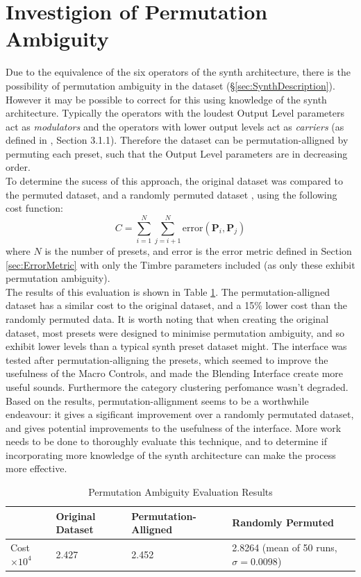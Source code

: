 \documentclass[11pt, oneside]{report}   	%
\renewcommand{\vec}[1]{\mathbf{#1}}
\begin{document}
\section{Investigion of Permutation Ambiguity}\label{sec:PermutationAmbiguity}
\vspace{-5pt}
Due to the equivalence of the six operators of the synth architecture, there is the possibility of permutation ambiguity in the dataset (\S \ref{sec:SynthDescription}). However it may be possible to correct for this using knowledge of the synth architecture. Typically the operators with the loudest Output Level parameters act as \emph{modulators} and the operators with lower output levels act as \emph{carriers} (as defined in \cite{YeeKing}, Section 3.1.1). Therefore the dataset can be permutation-alligned by permuting each preset, such that the Output Level parameters are in decreasing order.\\
To determine the sucess of this approach, the original dataset was compared to the permuted dataset, and a randomly permuted dataset , using the following cost function:
\begin{equation}
	C = \sum_{i = 1}^{N}\sum_{j = i+1}^{N}\mathrm{error}(\vec{P}_i, \vec{P}_j)
\end{equation}
where $N$ is the number of presets, and $\mathrm{error}$ is the error metric defined in Section \ref{sec:ErrorMetric} with only the Timbre parameters included (as only these exhibit permutation ambiguity).\\
The results of this evaluation is shown in Table \ref{tab:PermutationAmbiguity}. The permutation-alligned dataset has a similar cost to the original dataset, and a 15\% lower cost than the randomly permuted data. It is worth noting that when creating the original dataset, most presets were designed to minimise permutation ambiguity, and so exhibit lower levels than a typical synth preset dataset might.  The interface was tested after permutation-alligning the presets, which seemed to improve the usefulness of the Macro Controls, and made the Blending Interface create more useful sounds. Furthermore the category clustering perfomance wasn't degraded. Based on the results, permutation-allignment seems to be a worthwhile endeavour: it gives a sigificant improvement over a randomly permutated dataset, and gives potential improvements to the usefulness of the interface. More work needs to be done to thoroughly evaluate this technique, and to determine if incorporating more knowledge of the synth architecture can make the process more effective.
\begin{table}[h]
	\vspace{-20pt}
	\centering
	\begin{tabular}{l|l|l|l}
		& Original Dataset & Permutation-Alligned & Randomly Permuted \\ \hline
		Cost $\times 10^4$ & 2.427            & 2.452                 & 2.8264  (mean of 50 runs, $\sigma = 0.0098$)
	\end{tabular}
\caption{Permutation Ambiguity Evaluation Results}
\label{tab:PermutationAmbiguity}
\vspace{-20pt}
\end{table}
\end{document}
